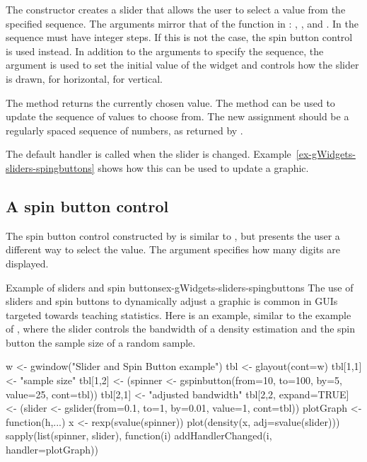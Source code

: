The  constructor creates a slider that allows the
user to select a value from the specified sequence.  The arguments
mirror that of the  function in \R:
, , and
.  In  the sequence must have
integer steps. If this is not the case, the spin button control is
used instead. In addition to the arguments to specify the sequence,
the argument  is used to set the initial
value of the widget and  controls how
the slider is drawn,  for horizontal,  for
vertical.

The  method returns the currently chosen
value. The \method{[\ASSIGN}{gslider} method can be used to update the
sequence of values to choose from. The new assignment should be a
regularly spaced sequence of numbers, as returned by .

The default handler is called when the slider is changed. Example~\ref{ex-gWidgets-sliders-spingbuttons}
shows how this can be used to update a graphic.


\subsection{A spin button control}
\label{sec:gWidgets-spin-button-control}

The spin button control constructed by  is
similar to  , but presents the user a different
way to select the value. The argument 
specifies how many digits are displayed. 

\begin{example}{Example of sliders and spin buttons}{ex-gWidgets-sliders-spingbuttons}
  The use of sliders and spin buttons to dynamically adjust a graphic
  is common in \R\/ GUIs targeted towards teaching statistics. Here is
  an example, similar to the  example of ,
  where the slider controls the bandwidth of a density estimation and
  the spin button the sample size of a random sample.
\begin{Schunk}
\begin{Sinput}
 w <- gwindow("Slider and Spin Button example") 
 tbl <- glayout(cont=w)
 tbl[1,1] <- "sample size"
 tbl[1,2] <- (spinner <- gspinbutton(from=10, to=100, by=5, 
                                     value=25, cont=tbl))
 tbl[2,1] <- "adjusted bandwidth"
 tbl[2,2, expand=TRUE] <- (slider <- gslider(from=0.1, to=1, 
            by=0.01, value=1, cont=tbl))
 plotGraph <- function(h,...) {
   x <- rexp(svalue(spinner))
   plot(density(x, adj=svalue(slider)))
 }
 sapply(list(spinner, slider), function(i) 
   addHandlerChanged(i, handler=plotGraph))
\end{Sinput}
\end{Schunk}
\end{example}




